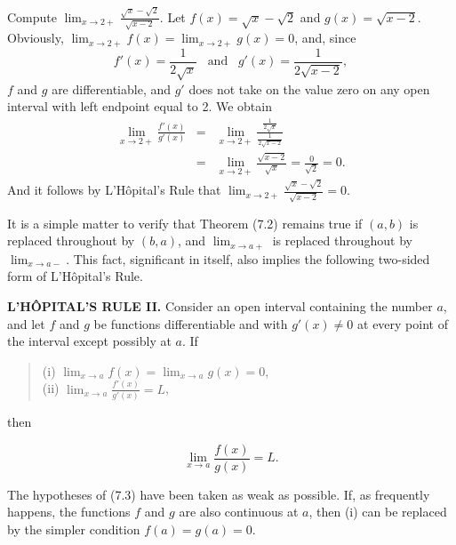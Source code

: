\begin{example}
Compute $\lim_{x \rightarrow 2+}\frac{\sqrt x - \sqrt 2}{\sqrt{x-2}}.$ Let $f (x) = \sqrt x - \sqrt 2$ and $g(x) = \sqrt {x - 2}$. Obviously, $\lim_{x \rightarrow 2+} f(x) = \lim_{x \rightarrow 2+} g(x) = 0$, and, since
$$
f'(x)= \frac{1}{2\sqrt x} \;\;\; \mbox{and}\;\;\; g'(x)= \frac{1}{2\sqrt{x - 2}},
$$
$f$ and $g$ are differentiable, and  $g'$ does not take on the value zero on any open interval with left endpoint equal to 2. We obtain
\begin{eqnarray*}
\lim_{x \rightarrow 2+}\frac{f'(x)}{g'(x)} 
&=& \lim_{x \rightarrow 2+} \frac { \frac{1}{2 \sqrt x}} {\frac{1}{2 \sqrt{x - 2}} }\\
&=& \lim_{x \rightarrow 2+} \frac{\sqrt{x - 2}}{\sqrt x} = \frac{0}{\sqrt 2} = 0.
\end{eqnarray*}
And it follows by L'H\^{o}pital's Rule that $\lim_{x \rightarrow 2+} \frac{\sqrt x - \sqrt 2}{\sqrt{x-2}} = 0$.

It is a simple matter to verify that Theorem (7.2) remains true if $(a, b)$ is replaced throughout by $(b, a)$, and $\lim_{x \rightarrow a+}$ is replaced throughout by $\lim_{x \rightarrow a-}$.  This fact, significant in itself, also implies the following two-sided form of L'H\^{o}pital's Rule.
\end{example}

\begin{theorem} %
\textbf{L'H\^{O}PITAL'S RULE II.}  Consider an open interval containing the number $a$, and let $f$ and $g$ be functions differentiable and with $g'(x) \neq 0$ at every point of the interval except possibly at $a$. If


\begin{quote}
\begin{description}
\item[(i) $\lim_{x \rightarrow a} f(x) = \lim_{x \rightarrow a} g(x) = 0$,]
\item[(ii) $\lim_{x \rightarrow a} \frac{f'(x)}{g'(x)} = L$,]
\end{description}
\end{quote} 

\noindent then 

$$
\lim_{x \rightarrow a}\frac{ f(x)}{g(x)} = L.
$$
\end{theorem}

The hypotheses of (7.3) have been taken as weak as possible. If, as frequently happens, the functions $f$ and $g$ are also continuous at $a$, then (i) can be replaced by the simpler condition $f(a) = g(a) = 0$.


